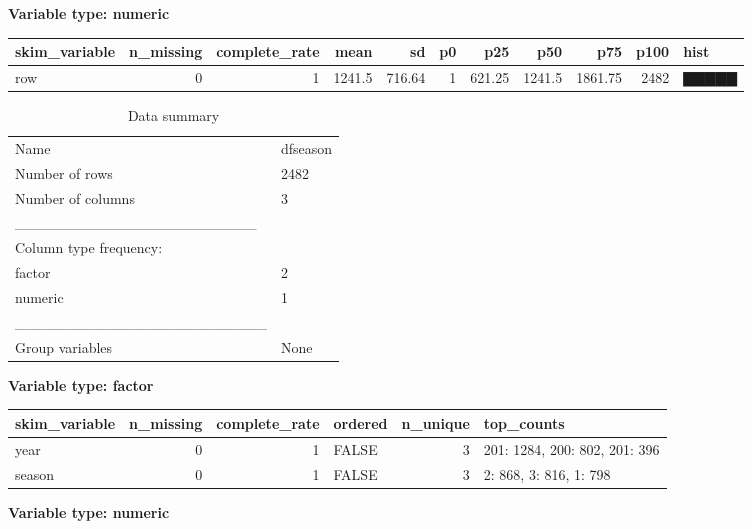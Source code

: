 \documentclass[]{article}
\newenvironment{Shaded}{\begin{snugshade}}{\end{snugshade}}
\newcommand{\CommentTok}[1]{\textcolor[rgb]{0.56,0.35,0.01}{\textit{#1}}}
\newcommand{\DataTypeTok}[1]{\textcolor[rgb]{0.13,0.29,0.53}{#1}}
\newcommand{\KeywordTok}[1]{\textcolor[rgb]{0.13,0.29,0.53}{\textbf{#1}}}
\newcommand{\NormalTok}[1]{#1}
\newcommand{\OperatorTok}[1]{\textcolor[rgb]{0.81,0.36,0.00}{\textbf{#1}}}
\newcommand{\StringTok}[1]{\textcolor[rgb]{0.31,0.60,0.02}{#1}}
\begin{document}
\textbf{Variable type: numeric}

\begin{longtable}[]{@{}lrrrrrrrrrl@{}}
\toprule
skim\_variable & n\_missing & complete\_rate & mean & sd & p0 & p25 &
p50 & p75 & p100 & hist\tabularnewline
\midrule
\endhead
row & 0 & 1 & 1241.5 & 716.64 & 1 & 621.25 & 1241.5 & 1861.75 & 2482 &
▇▇▇▇▇\tabularnewline
\bottomrule
\end{longtable}

\begin{Shaded}
\end{Shaded}

\begin{longtable}[]{@{}ll@{}}
\caption{Data summary}\tabularnewline
\toprule
\endhead
Name & dfseason\tabularnewline
Number of rows & 2482\tabularnewline
Number of columns & 3\tabularnewline
\_\_\_\_\_\_\_\_\_\_\_\_\_\_\_\_\_\_\_\_\_\_\_ &\tabularnewline
Column type frequency: &\tabularnewline
factor & 2\tabularnewline
numeric & 1\tabularnewline
\_\_\_\_\_\_\_\_\_\_\_\_\_\_\_\_\_\_\_\_\_\_\_\_ &\tabularnewline
Group variables & None\tabularnewline
\bottomrule
\end{longtable}

\textbf{Variable type: factor}

\begin{longtable}[]{@{}lrrlrl@{}}
\toprule
skim\_variable & n\_missing & complete\_rate & ordered & n\_unique &
top\_counts\tabularnewline
\midrule
\endhead
year & 0 & 1 & FALSE & 3 & 201: 1284, 200: 802, 201: 396\tabularnewline
season & 0 & 1 & FALSE & 3 & 2: 868, 3: 816, 1: 798\tabularnewline
\bottomrule
\end{longtable}

\textbf{Variable type: numeric}
\end{document}

